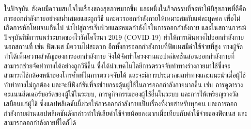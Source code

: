 ในปัจจุบัน สังคมมีความสนใจในเรื่องของสุขภาพมากขึ้น และหนึ่งในกิจกรรมที่จะทำให้มีสุขภาพที่ดีคือการออกกำลังกายอย่างสม่ำเสมอและถูกวิธี และควรออกกำลังกายให้เหมาะสมกับแต่ละบุคคล เพื่อไม่เกิดการหักโหมจนเกินไป นำไปสู่การเจ็บป่วยและหมดกำลังใจในการออกกำลังกาย  และในสถานการณ์ปัจจุบันที่มีการแพร่ระบาดของไวรัสโคโรนา 2019 (COVID-19) ทำให้การเดินทางไปออกกำลังกายนอกสถานที่ เช่น ฟิตเนส มีความไม่สะดวก อีกทั้งการออกกำลังกายที่ฟิตเนสมีค่าใช้จ่ายที่สูง ทางผู้จัดทำได้เห็นความสำคัญของการออกกำลังกาย จึงได้จัดทำโครงงานแอปพลิเคชันสอนออกกำลังกายที่สามารถช่วยจัดท่าทางได้อย่างถูกวิธีขึ้น ซึ่งได้นำเทคโนโลยีการตรวจจับท่าทางร่างกายมาใช้ซึ่งจะสามารถใช้กล้องหน้าของโทรศัพท์ในการตรวจจับได้ และจะมีการประมวลผลท่าทางและแนะนำเมื่อผู้ใช้ทำท่าทางไม่ถูกต้อง และจะมีฟังก์ชันที่จะช่วยกระตุ้นผู้ใช้ในการออกกำลังกายมากขึ้น เช่น การดูตารางคะแนนลีดเดอร์บอร์ดของผู้ใช้ในระบบ, การดูกิจกรรมของผู้ใช้อื่นในระบบ และการให้เหรียญรางวัลเสมือนแก่ผู้ใช้ ซึ่งแอปพลิเคชันนี้ช่วยให้การออกกำลังกายเป็นเรื่องที่ง่ายสำหรับทุกคน  และการออกกำลังกายผ่านแอปพลิเคชันดังกล่าวทำให้เสียค่าใช้จ่ายน้อยลงมากเมื่อเทียบกับค่าใช้จ่ายของฟิตเนส และสามารถออกกำลังกายที่ใดก็ได้